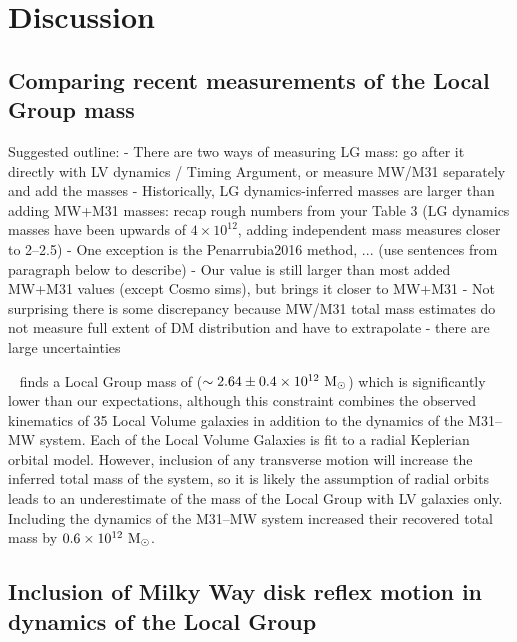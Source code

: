 \documentclass[twocolumn]{aastex631}
\begin{document}
\section{Discussion}
\label{sec:discussion}

\subsection{Comparing recent measurements of the Local Group mass}


Suggested outline:
- There are two ways of measuring LG mass: go after it directly with LV dynamics / Timing Argument, or measure MW/M31 separately and add the masses
- Historically, LG dynamics-inferred masses are larger than adding MW+M31 masses: recap rough numbers from your Table 3 (LG dynamics masses have been upwards of $4\times 10^{12}$, adding independent mass measures closer to 2--2.5)
- One exception is the Penarrubia2016 method, ... (use sentences from paragraph below to describe)
- Our value is still larger than most added MW+M31 values (except Cosmo sims), but brings it closer to MW+M31
- Not surprising there is some discrepancy because MW/M31 total mass estimates do not measure full extent of DM distribution and have to extrapolate - there are large uncertainties

~\cite{Penarrubia2016} finds a Local Group mass of ($\sim2.64\pm0.4\times
10^{12}~\mathrm{M}_\odot$) which is significantly lower than our expectations, although this
constraint combines the observed kinematics of 35 Local Volume galaxies in
addition to the dynamics of the M31--MW system.
Each of the Local Volume Galaxies is fit to a radial Keplerian orbital model.
However, inclusion of any transverse motion will increase the inferred total
mass of the system, so it is likely the assumption of radial orbits leads to
an underestimate of the mass of the Local Group with LV galaxies only.
Including the dynamics of the M31--MW system increased their recovered
total mass by $0.6\times10^{12}~\mathrm{M}_\odot$.


\subsection{Inclusion of Milky Way disk reflex motion in dynamics of the Local Group}
\end{document}
